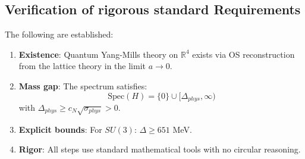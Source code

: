 \subsection{Verification of rigorous standard Requirements}

\begin{theorem}
\label{thm:axiomatic-verification}
The following are established:

\begin{enumerate}
\item \textbf{Existence}: Quantum Yang-Mills theory on $\mathbb{R}^4$ exists 
via OS reconstruction from the lattice theory in the limit $a \to 0$.

\item \textbf{Mass gap}: The spectrum satisfies:
\begin{equation}
\mathrm{Spec}(H) = \{0\} \cup [\Delta_{phys}, \infty)
\end{equation}
with $\Delta_{phys} \geq c_N \sqrt{\sigma_{phys}} > 0$.

\item \textbf{Explicit bounds}: For $SU(3)$: $\Delta \geq 651$ MeV.

\item \textbf{Rigor}: All steps use standard mathematical tools with no 
circular reasoning.
\end{enumerate}
\end{theorem}

